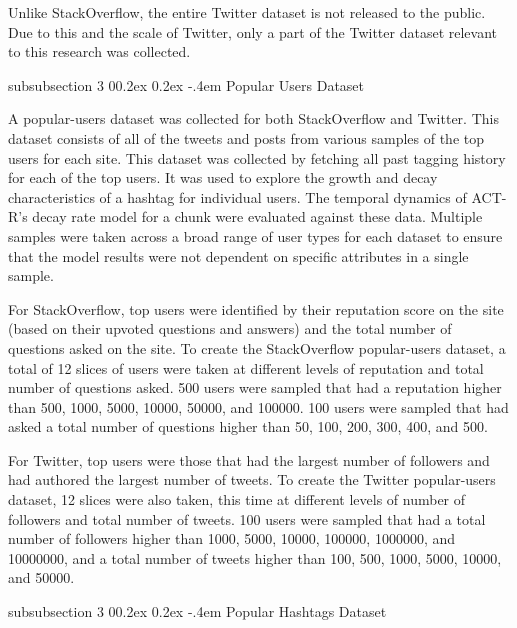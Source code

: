 \documentclass[man,donotrepeattitle]{apa6}
\makeatletter
\renewcommand{\subsubsection}{%
  \@startsection
  {subsubsection}%
  {3}%
  {\parindent}%
  {0\baselineskip \@plus 0.2ex \@minus 0.2ex}%
  {-.4em}%
  {\normalfont\normalsize\bfseries\addperi}}
\makeatother
\begin{document}
Unlike StackOverflow, the entire Twitter dataset is not released to the public.
Due to this and the scale of Twitter, only a part of the Twitter dataset relevant to this research was collected.

\subsubsection{Popular Users Dataset}

A popular-users dataset was collected for both StackOverflow and Twitter.
This dataset consists of all of the tweets and posts from various samples of the top users for each site.
This dataset was collected by fetching all past tagging history for each of the top users.
It was used to explore the growth and decay characteristics of a hashtag for individual users.
The temporal dynamics of ACT-R's decay rate model for a chunk were evaluated against these data.
Multiple samples were taken across a broad range of user types for each dataset to ensure that the model results were not dependent on specific attributes in a single sample.

For StackOverflow, top users were identified by their reputation score on the site (based on their upvoted questions and answers) and the total number of questions asked on the site.
To create the StackOverflow popular-users dataset, a total of 12 slices of users were taken at different levels of reputation and total number of questions asked.
500 users were sampled that had a reputation higher than \num{500}, \num{1000}, \num{5000}, \num{10000}, \num{50000}, and \num{100000}.
100 users were sampled that had asked a total number of questions higher than \num{50}, \num{100}, \num{200}, \num{300}, \num{400}, and \num{500}.

For Twitter, top users were those that had the largest number of followers and had authored the largest number of tweets.
To create the Twitter popular-users dataset, 12 slices were also taken, this time at different levels of number of followers and total number of tweets.
100 users were sampled that had a total number of followers higher than \num{1000}, \num{5000}, \num{10000}, \num{100000}, \num{1000000}, and \num{10000000},
and a total number of tweets higher than \num{100}, \num{500}, \num{1000}, \num{5000}, \num{10000}, and \num{50000}.

\subsubsection{Popular Hashtags Dataset}
\end{document}
